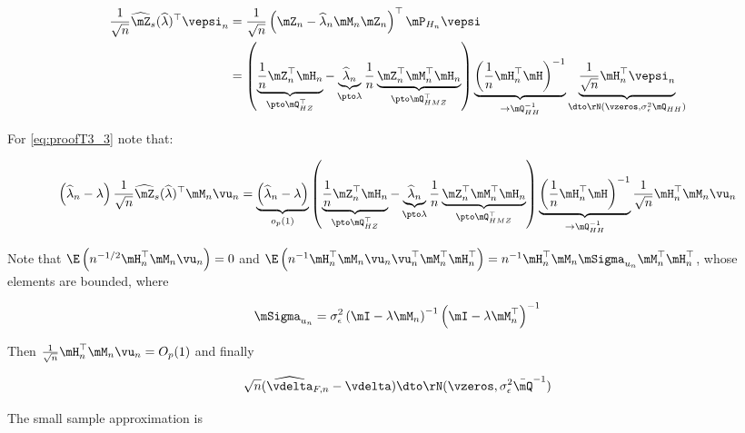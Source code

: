 \begin{subappendices}
\begin{equation}
\begin{aligned}
   \frac{1}{\sqrt{n}}\widehat{\mZ}_s(\widehat{\lambda})^\top\vepsi_n & = \frac{1}{\sqrt{n}}\left(\mZ_n -\widehat{\lambda}_n\mM_n\mZ_n\right)^\top\mP_{H_n}\vepsi \\
                                                                     & = \left(\underbrace{\frac{1}{n}\mZ_n^\top \mH_n}_{\pto \mQ_{HZ}^\top} - \underbrace{\widehat{\lambda}_n}_{\pto \lambda}\frac{1}{n}\underbrace{\mZ_n^\top\mM_n^\top\mH_n}_{\pto \mQ_{HMZ}^\top}\right)\underbrace{\left(\frac{1}{n}\mH_n^\top\mH\right)^{-1}}_{\to \mQ_{HH}^{-1}}\underbrace{\frac{1}{\sqrt{n}}\mH_n^\top\vepsi_n}_{\dto \rN(\vzeros, \sigma^2_{\epsilon}\mQ_{HH})}
\end{aligned}
\end{equation}

For \ref{eq:proofT3_3} note that:

\begin{equation}
    \left(\widehat{\lambda}_n- \lambda\right)\frac{1}{\sqrt{n}}\widehat{\mZ}_s(\widehat{\lambda})^\top\mM_n\vu_n  = \underbrace{\left(\widehat{\lambda}_n- \lambda\right)}_{o_p(1)}\left(\underbrace{\frac{1}{n}\mZ_n^\top \mH_n}_{\pto \mQ_{HZ}^\top} - \underbrace{\widehat{\lambda}_n}_{\pto \lambda}\frac{1}{n}\underbrace{\mZ_n^\top\mM_n^\top\mH_n}_{\pto \mQ_{HMZ}^\top}\right)\underbrace{\left(\frac{1}{n}\mH_n^\top\mH\right)^{-1}}_{\to \mQ_{HH}^{-1}}\frac{1}{\sqrt{n}}\mH_n^\top\mM_n\vu_n
\end{equation}

Note that $\E\left(n^{-1/2}\mH_n^\top\mM_n\vu_n\right) = 0$ and $\E\left(n^{-1}\mH_n^\top\mM_n\vu_n\vu^\top_n\mM_n^\top\mH^\top_n\right) = n^{-1} \mH_n^\top\mM_n\mSigma_{u_n}\mM_n^\top\mH^\top_n$, whose elements are bounded, where

\begin{equation*}
\mSigma_{u_n} = \sigma^2_{\epsilon}\left(\mI - \lambda\mM_n\right)^{-1}\left(\mI - \lambda\mM_n^\top\right)^{-1}
\end{equation*}

Then $\frac{1}{\sqrt{n}}\mH_n^\top\mM_n\vu_n = O_p(1)$ and finally

\begin{equation}
   \sqrt{n} (\widehat{\vdelta}_{F, n} - \vdelta)\dto \rN(\vzeros, \sigma^2_{\epsilon}\bar{\mQ}^{-1})
\end{equation}

The small sample approximation is


\end{subappendices}
